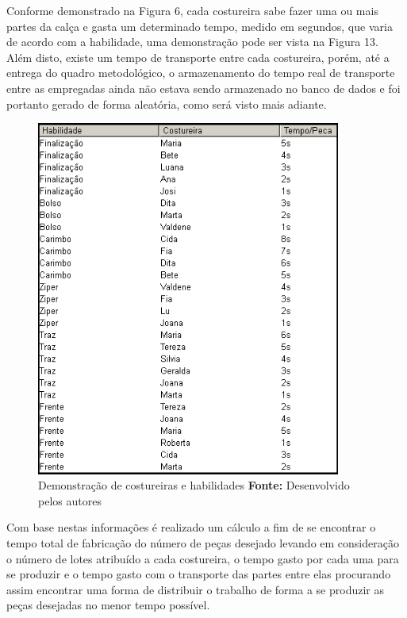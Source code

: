 \par Conforme demonstrado na Figura 6, cada costureira sabe fazer uma ou mais partes da calça e gasta um determinado tempo, medido em segundos, que varia de acordo com a habilidade, uma demonstração pode ser vista na Figura 13. Além disto, existe um tempo de transporte entre cada costureira, porém, até a entrega do quadro metodológico, o armazenamento do tempo
real de transporte entre as empregadas ainda não estava sendo armazenado no banco de dados e foi portanto gerado de forma aleatória, 
como será visto mais adiante.

\newpage

\begin{figure}[h!]
	\centerline{\includegraphics[width=10cm]{./imagens/tempo_habilidade2.png}}
	\caption[Costureiras e Habilidades]
	{Demonstração de costureiras e habilidades \textbf{Fonte:} Desenvolvido pelos autores}
	\label{fig:exemplo1}
\end{figure}

\par Com base nestas informações é realizado um cálculo a fim de se encontrar o tempo total de fabricação do número de peças
desejado levando em consideração o número de lotes atribuído a cada costureira, o tempo gasto por cada uma para se produzir e 
o tempo gasto com o transporte das partes entre elas procurando assim encontrar uma forma de distribuir o trabalho de forma a 
se produzir as peças desejadas no menor tempo possível. 

